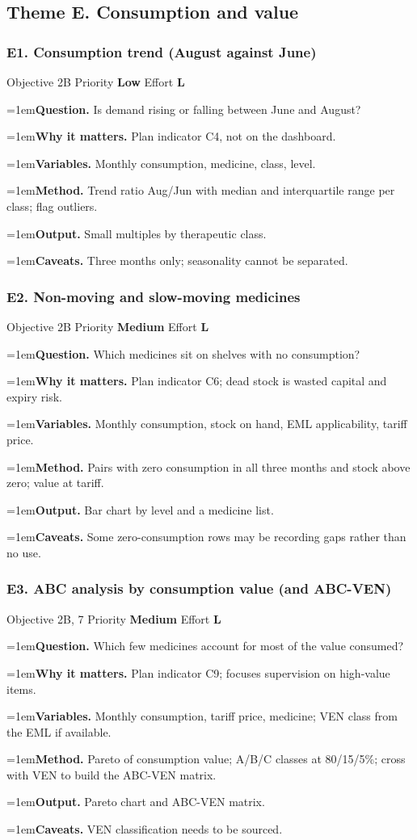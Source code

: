 \documentclass[10pt,a4paper]{article}
\newcommand{\field}[2]{\par\hangindent=1em\textbf{#1.} #2}
\begin{document}
\subsection{Theme E. Consumption and value}
\subsubsection*{E1. Consumption trend (August against June)}
{\footnotesize\color{gray} Objective 2B \textperiodcentered{} Priority \textbf{Low} \textperiodcentered{} Effort \textbf{L}}
\field{Question}{Is demand rising or falling between June and August?}
\field{Why it matters}{Plan indicator C4, not on the dashboard.}
\field{Variables}{Monthly consumption, medicine, class, level.}
\field{Method}{Trend ratio Aug/Jun with median and interquartile range per class; flag outliers.}
\field{Output}{Small multiples by therapeutic class.}
\field{Caveats}{Three months only; seasonality cannot be separated.}
\subsubsection*{E2. Non-moving and slow-moving medicines}
{\footnotesize\color{gray} Objective 2B \textperiodcentered{} Priority \textbf{Medium} \textperiodcentered{} Effort \textbf{L}}
\field{Question}{Which medicines sit on shelves with no consumption?}
\field{Why it matters}{Plan indicator C6; dead stock is wasted capital and expiry risk.}
\field{Variables}{Monthly consumption, stock on hand, EML applicability, tariff price.}
\field{Method}{Pairs with zero consumption in all three months and stock above zero; value at tariff.}
\field{Output}{Bar chart by level and a medicine list.}
\field{Caveats}{Some zero-consumption rows may be recording gaps rather than no use.}
\subsubsection*{E3. ABC analysis by consumption value (and ABC-VEN)}
{\footnotesize\color{gray} Objective 2B, 7 \textperiodcentered{} Priority \textbf{Medium} \textperiodcentered{} Effort \textbf{L}}
\field{Question}{Which few medicines account for most of the value consumed?}
\field{Why it matters}{Plan indicator C9; focuses supervision on high-value items.}
\field{Variables}{Monthly consumption, tariff price, medicine; VEN class from the EML if available.}
\field{Method}{Pareto of consumption value; A/B/C classes at 80/15/5\%; cross with VEN to build the ABC-VEN matrix.}
\field{Output}{Pareto chart and ABC-VEN matrix.}
\field{Caveats}{VEN classification needs to be sourced.}
\end{document}
